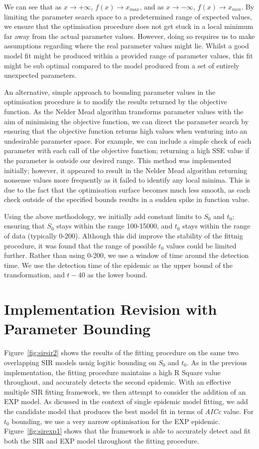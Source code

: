 We can see that as $x\rightarrow +\infty$, $f(x)\rightarrow x_{max}$,
and as $x\rightarrow -\infty$, $f(x)\rightarrow x_{min}$. By limiting
the parameter search space to a predetermined range of expected
values, we ensure that the optimisation procedure does not get stuck
in a local minimum far away from the actual parameter values. However,
doing so requires us to make assumptions regarding where the real
parameter values might lie. Whilst a good model fit might be produced
within a provided range of parameter values, this fit might be sub
optimal compared to the model produced from a set of entirely
unexpected parameters. 

An alternative, simple approach to bounding parameter values in the
optimisation procedure is to modify the results returned by the
objective function. As the Nelder Mead algorithm transforms parameter
values with the aim of minimising the objective function, we can
direct the parameter search by ensuring that the objective function
returns high values when venturing into an undesirable parameter
space. For example, we can include a simple check of each parameter
with each call of the objective function; returning a high SSE value
if the parameter is outside our desired range. This method was
implemented initially; however, it appeared to result in the Nelder
Mead algorithm returning nonsense values more frequently as it failed
to identify any local minima. This is due to the fact that the
optimisation surface becomes much less smooth, as each check outside
of the specified bounds results in a sudden spike in function value.  

Using the above methodology, we initially add constant limits to $S_0$
and $t_0$; ensuring that $S_0$ stays within the range 100-15000, and
$t_0$ stays within the range of data (typically 0-200). Although this
did improve the stability of the fittnig procedure, it was found that
the range of possible $t_0$ values could be limited further. Rather
than using 0-200, we use a window of time around the detection
time. We use the detection time of the epidemic as the upper bound of
the transformation, and $t-40$ as the lower bound.

\section{Implementation Revision with Parameter Bounding}
Figure~\ref{fig:sirsir2} shows the results of the fitting procedure on
the same two overlapping SIR models usnig logitic bounding on $S_0$
and $t_0$. As in the previous implementation, the fitting procedure
maintains a high R Square value throughout, and accurately detects the
second epidemic. With an effective multiple SIR fitting framework, we
then attempt to consider the addition of an EXP model. As dicussed in
the context of single epidemic model fitting, we add the candidate
model that produces the best model fit in terms of \emph{AICc}
value. For $t_0$ bounding, we use a very narrow optimisation for the
EXP epidemic. Figure~\ref{fig:sirexp1} shows that the framework is able to
accurately detect and fit both the SIR and EXP model throughout the
fitting procedure.



